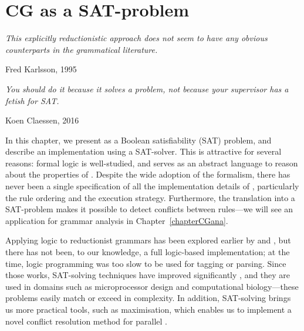 \def\la{\text{\em la}}
\def\casa{\text{\em casa}}
\def\grande{\text{\em grande}}

\def\det{{\text{\sc Det}}}
\def\prn{{\text{\sc  Prn}}}
\def\n{{\text{\sc N}}}
\def\v{{\text{\sc V}}}
\def\adj{{\text{\sc Adj}}}

\def\laDet{\la_\det}
\def\laPrn{\la_\prn}
\def\casaN{\casa_\n}
\def\casaV{\casa_\v}
\def\grandeAdj{\grande_\adj}

\def\t#1{\texttt{#1}}
\def\ob#1{\overbrace{ #1 \rule{0pt}{2ex}}}
\def\cgrule#1{{\ttfamily #1}}

\def\defRule{``do not remove the last reading''}

\chapter{CG as a SAT-problem}
\label{chapterCGSAT}

\epigraph{\it This explicitly reductionistic approach does not seem to
  have any obvious counterparts in the grammatical literature.}{Fred Karlsson, 1995}


\epigraph{\it You should do it because it solves a problem, not because your supervisor has a fetish for SAT.}{Koen Claessen, 2016}


In this chapter, we present \onlycg{} as a Boolean satisfiability
(SAT) problem, and describe an implementation using a SAT-solver.
This is attractive for several reasons: formal logic is well-studied,
and serves as an abstract language to reason about the properties of
\onlycg{}. Despite the wide adoption of the formalism, there has never
been a single specification of all the implementation details of
\onlycg{}, particularly the rule ordering and the execution
strategy. Furthermore, the translation into a SAT-problem makes it
possible to detect conflicts between rules---we will see an
application for grammar analysis in Chapter~\ref{chapterCGana}.

Applying logic to reductionist grammars has been explored earlier by
\citet{lager98} and \citet{lager_nivre01}, but there has not been, to
our knowledge, a full logic-based \onlycg{} implementation; at the
time, logic programming was too slow to be used for tagging or
parsing.  Since those works, SAT-solving techniques have improved
significantly \cite{marques_silva2010}, and they are used in domains
such as microprocessor design and computational biology---these
problems easily match or exceed \onlycg{} in complexity.  In addition,
SAT-solving brings us more practical tools, such as maximisation,
which enables us to implement a novel conflict resolution method for
parallel \onlycg{}.

